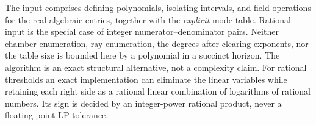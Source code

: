 The input comprises defining polynomials, isolating intervals, and
field operations for the real-algebraic entries, together with the
\emph{explicit} mode table. Rational input is the special case of
integer numerator--denominator pairs. Neither chamber enumeration,
ray enumeration, the degrees after clearing exponents, nor the table
size is bounded here by a polynomial in a succinct horizon. The
algorithm is an exact structural alternative, not a complexity claim.
For rational thresholds an exact implementation can eliminate the
linear variables while retaining each right side as a rational linear
combination of logarithms of rational numbers. Its sign is decided by
an integer-power rational product, never a floating-point LP tolerance.
